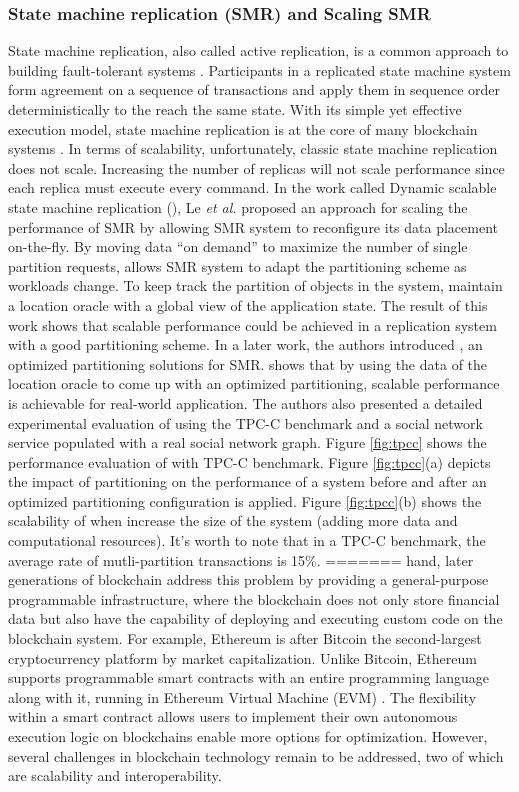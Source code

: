 \subsubsection{State machine replication (SMR) and Scaling SMR}
State machine replication, also called active replication, is a common approach
to building fault-tolerant systems \cite{Lam78, Sch90}. Participants in a
replicated state machine system form agreement on a sequence of transactions and
apply them in sequence order deterministically to the reach the same state. With
its simple yet effective execution model, state machine replication is at the
core of many blockchain systems \cite{baudet2019state, cachin2016architecture}.
In terms of scalability, unfortunately, classic state machine replication does
not scale. Increasing the number of replicas will not scale performance since
each replica must execute every command. In the work called Dynamic scalable
state machine replication (\dssmr), Le \emph{et al.} proposed an approach for
scaling the performance of SMR by allowing SMR system to reconfigure its data
placement on-the-fly. By moving data ``on demand'' to maximize the number of
single partition requests, \dssmr{} allows SMR system to adapt the partitioning
scheme as workloads change. To keep track the partition of objects in the
system, \dssmr{} maintain a location oracle with a global view of the
application state. The result of this work shows that scalable performance could
be achieved in a replication system with a good partitioning scheme. In a later
work, the authors introduced \dynastar, an optimized partitioning solutions for
SMR. \dynastar shows that by using the data of the location oracle to come up
with an optimized partitioning, scalable performance is achievable for
real-world application. The authors also presented a detailed experimental
evaluation of \dynastar using the TPC-C benchmark and a social network service
populated with a real social network graph. Figure \ref{fig:tpcc} shows the
performance evaluation of \dynastar with TPC-C benchmark. Figure
\ref{fig:tpcc}(a) depicts the impact of partitioning on the performance of a
system before and after an optimized partitioning configuration is applied.
Figure \ref{fig:tpcc}(b) shows the scalability of \dynastar when increase the
size of the system (adding more data and computational resources). It's worth to
note that in a TPC-C benchmark, the average rate of mutli-partition transactions
is 15\%.
=======
hand, later generations of blockchain address this problem by providing a
general-purpose programmable infrastructure, where the blockchain does not only
store financial data but also have the capability of deploying and executing
custom code on the blockchain system. For example, Ethereum is after Bitcoin the
second-largest cryptocurrency platform by market capitalization. Unlike Bitcoin,
Ethereum supports programmable smart contracts with an entire programming
language along with it, running in Ethereum Virtual Machine (EVM)
\cite{ethereum:evm}. The flexibility within a smart contract allows users to
implement their own autonomous execution logic on blockchains enable more
options for optimization. However, several challenges in blockchain technology
remain to be addressed, two of which are scalability and interoperability.

